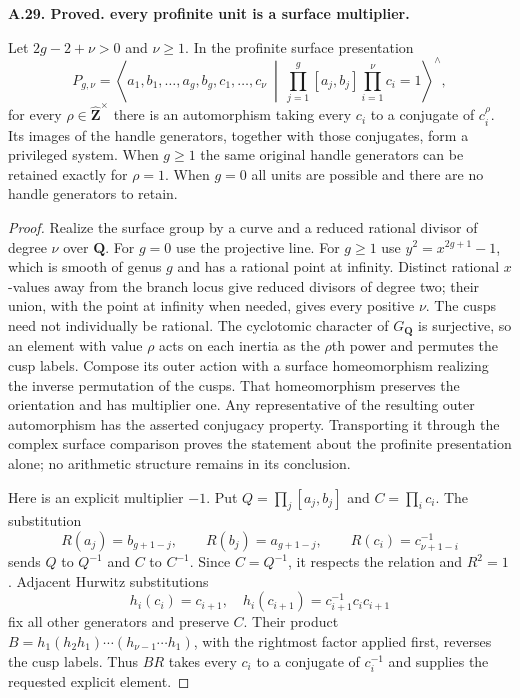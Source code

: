 \documentclass[11pt,oneside]{article}
\makeatletter
\newcounter{statementanchor}
\newenvironment{statement}[3]{%
 \refstepcounter{statementanchor}\def\@currentlabel{#1}%
 \par\addvspace{9pt}\noindent
 \textbf{#1. #2. #3.}\par\nobreak\noindent\ignorespaces
}{\par\addvspace{5pt}}
\makeatother
\begin{document}
\begin{statement}{A.29}{Proved}{every profinite unit is a surface multiplier}
\label{st:A.29}
\label{A:all-multipliers}
Let $2g-2+\nu>0$ and $\nu\ge1$.  In the profinite
surface presentation
\[
 P_{g,\nu}=\left\langle a_1,b_1,\ldots,a_g,b_g,
 c_1,\ldots,c_\nu\ \middle|\
 \prod_{j=1}^g[a_j,b_j]\prod_{i=1}^\nu c_i=1
                          \right\rangle^{\wedge},
\]
for every $\rho\in\widehat{\mathbf Z}^{\times}$
there is an automorphism taking every $c_i$ to a
conjugate of $c_i^\rho$.  Its images of the handle
generators, together with those conjugates, form a
privileged system.  When $g\ge1$ the same original
handle generators can be retained exactly for
$\rho=1$.  When $g=0$ all units are possible and
there are no handle generators to retain.
\end{statement}
\begin{proof}
Realize the surface group by a curve and a reduced
rational divisor of degree $\nu$ over $\mathbf Q$.
For $g=0$ use the projective line.  For $g\ge1$ use
$y^2=x^{2g+1}-1$, which is smooth of genus $g$ and
has a rational point at infinity.  Distinct rational
$x$-values away from the branch locus give reduced
divisors of degree two; their union, with the point
at infinity when needed, gives every positive $\nu$.
The cusps need not individually be rational.  The
cyclotomic character of $G_{\mathbf Q}$ is surjective,
so an element with value $\rho$ acts on each inertia
as the $\rho$th power and permutes the cusp labels.
Compose its outer action with a surface homeomorphism
realizing the inverse permutation of the cusps.
That homeomorphism preserves the orientation and has
multiplier one.  Any representative of the resulting
outer automorphism has the asserted conjugacy property.
Transporting it through the complex surface comparison
proves the statement about the profinite presentation
alone; no arithmetic structure remains in its conclusion.

Here is an explicit multiplier $-1$.  Put
$Q=\prod_j[a_j,b_j]$ and $C=\prod_i c_i$.  The
substitution
\[
 R(a_j)=b_{g+1-j},\qquad R(b_j)=a_{g+1-j},\qquad
 R(c_i)=c_{\nu+1-i}^{-1}
\]
sends $Q$ to $Q^{-1}$ and $C$ to $C^{-1}$.
Since $C=Q^{-1}$, it respects the relation and
$R^2=1$.  Adjacent Hurwitz substitutions
\[
 h_i(c_i)=c_{i+1},\quad
 h_i(c_{i+1})=c_{i+1}^{-1}c_i c_{i+1}
\]
fix all other generators and preserve $C$.
Their product
$B=h_1(h_2h_1)\cdots(h_{\nu-1}\cdots h_1)$,
with the rightmost factor applied first, reverses
the cusp labels.  Thus $BR$ takes every $c_i$ to
a conjugate of $c_i^{-1}$ and supplies the requested
explicit element.


\end{proof}
\end{document}
